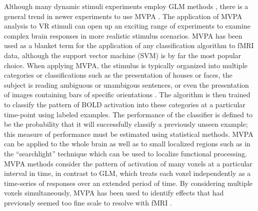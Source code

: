 \documentclass[preprint,5p,authoryear]{elsarticle}
\begin{document}
Although many dynamic stimuli experiments employ GLM methods \citep{Maguire1998,Calhoun2002,King2006,Mathiak2006,Spiers2007a}, there is a general trend in newer experiments to use MVPA \citep{Hassabis2009,Chadwick2010}. The application of MVPA analysis to VR stimuli can open up an exciting range of experiments to examine complex brain responses in more realistic stimulus scenarios.
MVPA has been used as a blanket term for the application of any classification algorithm to fMRI data, although the support vector machine (SVM) is by far the most popular choice.
When applying MVPA, the stimulus is typically organized into multiple categories or classifications such as the presentation of houses or faces, the subject is reading ambiguous or unambigous sentences, or even the presentation of images containing bars of specific orientations \citep{Haxby2001,Mitchell2003,Haynes2006}.
The algorithm is then trained to classify the pattern of BOLD activation into these categories at a particular time-point using labeled examples.
The performance of the classifier is defined to be the probability that it will successfully classify a previously unseen example;
this measure of performance must be estimated using statistical methods.
MVPA can be applied to the whole brain as well as to small localized regions such as in the ``searchlight'' technique \citep{Kriegeskorte2006} which can be used to localize functional processing.
MVPA methods consider the pattern of activation of many voxels at a particular interval in time, in contrast to GLM, which treats each voxel independently as a time-series of responses over an extended period of time.
By considering multiple voxels simultaneously, MVPA has been used to identify effects that had previously seemed too fine scale to resolve with fMRI \citep{Kamitani2005,Hassabis2009}.
\end{document}
